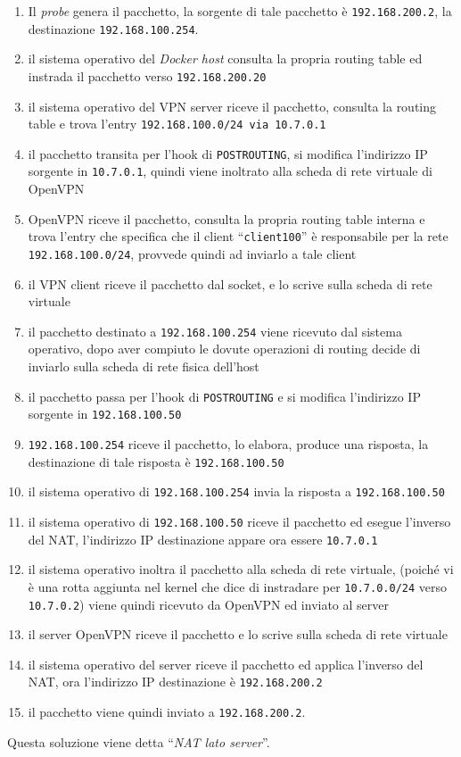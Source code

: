 \begin{enumerate}
  \item Il \textit{probe} genera il pacchetto, la sorgente di tale pacchetto è
  \texttt{192.168.200.2}, la destinazione \texttt{192.168.100.254}.
  \item il sistema operativo del \textit{Docker host} consulta la propria routing table
  ed instrada il pacchetto verso \texttt{192.168.200.20}
  \item il sistema operativo del VPN server riceve il pacchetto, consulta la
  routing table e trova l'entry \texttt{192.168.100.0/24 via 10.7.0.1}
  \item il pacchetto transita per l'hook di \texttt{POSTROUTING}, si modifica l'indirizzo IP
  sorgente in \texttt{10.7.0.1}, quindi viene inoltrato
  alla scheda di rete virtuale di OpenVPN
  \item OpenVPN riceve il pacchetto, consulta la propria routing table interna e
  trova l'entry che specifica che il client ``\texttt{client100}'' è responsabile per
  la rete \texttt{192.168.100.0/24}, provvede quindi ad inviarlo a tale client
  \item il VPN client riceve il pacchetto dal socket, e lo scrive sulla scheda di rete
  virtuale
  \item il pacchetto destinato a \texttt{192.168.100.254} viene ricevuto dal sistema
  operativo, dopo aver compiuto le dovute operazioni di routing decide di inviarlo
  sulla scheda di rete fisica dell'host
  \item il pacchetto passa per l'hook di \texttt{POSTROUTING} e si modifica l'indirizzo IP
  sorgente in \texttt{192.168.100.50}
  \item \texttt{192.168.100.254} riceve il pacchetto, lo elabora, produce una risposta,
  la destinazione di tale risposta è \texttt{192.168.100.50}
  \item il sistema operativo di \texttt{192.168.100.254} invia la risposta a
  \texttt{192.168.100.50}
  \item il sistema operativo di \texttt{192.168.100.50} riceve il pacchetto ed
  esegue l'inverso del NAT, l'indirizzo IP destinazione appare ora essere \texttt{10.7.0.1}
  \item il sistema operativo inoltra il pacchetto alla scheda di rete virtuale, (poiché
  vi è una rotta aggiunta nel kernel che dice di instradare per \texttt{10.7.0.0/24}
  verso \texttt{10.7.0.2})
  viene quindi ricevuto da OpenVPN ed inviato al server
  \item il server OpenVPN riceve il pacchetto e lo scrive sulla scheda di rete virtuale
  \item il sistema operativo del server riceve il pacchetto ed applica l'inverso del NAT,
  ora l'indirizzo IP destinazione è \texttt{192.168.200.2}
  \item il pacchetto viene quindi inviato  a \texttt{192.168.200.2}.
\end{enumerate}
Questa soluzione viene detta ``\textit{NAT lato server}''.
